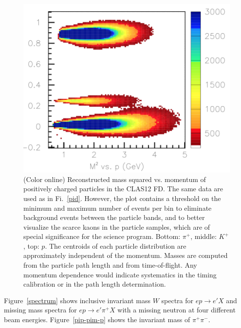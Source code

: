 \documentclass[final,3p,twocolumn]{elsarticle}
\begin{document}
\begin{figure}[hp!]
\centerline{\includegraphics[width=1.0\columnwidth]{FTOF1b_M2-vs-p.png}}
\caption{(Color online) Reconstructed mass squared vs. momentum of positively charged particles in 
the CLAS12 FD. The same data are used as in Fi.~\ref{pid}. However, the plot contains a threshold on the 
minimum and maximum number of events per bin to eliminate background events 
  between the particle bands, and to better visualize the scarce kaons in the particle samples, which are of
  special significance for the science program. 
  Bottom: $\pi^+$, middle: $K^+$, top: $p$. 
  The centroids of each particle distribution are approximately independent of the
  momentum. Masses are computed from the particle path length and from time-of-flight. Any momentum
  dependence would indicate systematics in the timing calibration or in the path length determination.}
\label{mass2-mom}
\end{figure} 


Figure~\ref{spectrum} shows inclusive invariant mass $W$ spectra for $ep \to e' X$ and missing mass spectra
for $ep \to e' \pi^+ X$ with a missing neutron at four different beam energies. 
Figure~\ref{pip-pim-p} shows the invariant mass of $\pi^+\pi^-$.
\end{document}
